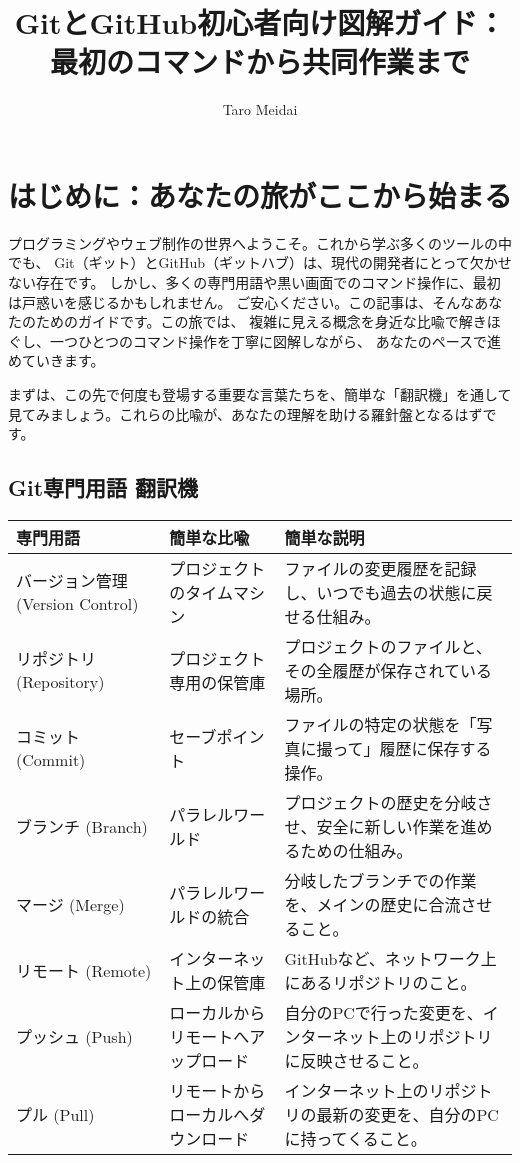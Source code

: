\documentclass{ltjsarticle}
\begin{document}
\title{GitとGitHub初心者向け図解ガイド：\\
最初のコマンドから共同作業まで}
\author{Taro Meidai}
\maketitle
\tableofcontents
\newpage

\section*{はじめに：あなたの旅がここから始まる}
プログラミングやウェブ制作の世界へようこそ。これから学ぶ多くのツールの中でも、
Git（ギット）とGitHub（ギットハブ）は、現代の開発者にとって欠かせない存在です。
しかし、多くの専門用語や黒い画面でのコマンド操作に、最初は戸惑いを感じるかもしれません。
ご安心ください。この記事は、そんなあなたのためのガイドです。この旅では、
複雑に見える概念を身近な比喩で解きほぐし、一つひとつのコマンド操作を丁寧に図解しながら、
あなたのペースで進めていきます。

まずは、この先で何度も登場する重要な言葉たちを、簡単な「翻訳機」を通して見てみましょう。これらの比喩が、あなたの理解を助ける羅針盤となるはずです。

\subsection*{Git専門用語 翻訳機}
\begin{tabularx}{\textwidth}{|l|l|X|}
\hline
専門用語 & 簡単な比喩 & 簡単な説明 \\ 
\hline
バージョン管理 (Version Control) & プロジェクトのタイムマシン & ファイルの変更履歴を記録し、いつでも過去の状態に戻せる仕組み。 \\ 
リポジトリ (Repository) & プロジェクト専用の保管庫 & プロジェクトのファイルと、その全履歴が保存されている場所。 \\ 
コミット (Commit) & セーブポイント & ファイルの特定の状態を「写真に撮って」履歴に保存する操作。 \\ 
ブランチ (Branch) & パラレルワールド & プロジェクトの歴史を分岐させ、安全に新しい作業を進めるための仕組み。 \\ 
マージ (Merge) & パラレルワールドの統合 & 分岐したブランチでの作業を、メインの歴史に合流させること。 \\ 
リモート (Remote) & インターネット上の保管庫 & GitHubなど、ネットワーク上にあるリポジトリのこと。 \\ 
プッシュ (Push) & ローカルからリモートへアップロード & 自分のPCで行った変更を、インターネット上のリポジトリに反映させること。 \\ 
プル (Pull) & リモートからローカルへダウンロード & インターネット上のリポジトリの最新の変更を、自分のPCに持ってくること。 \\ 
\hline
\end{tabularx}
\end{document}
